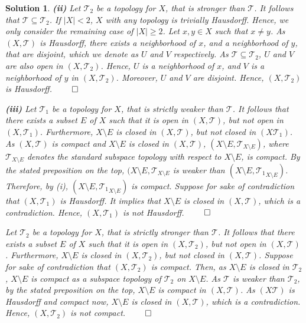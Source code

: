 \documentclass{article} %
\theoremstyle{quest}
\newtheorem*{solution}{Solution}
\begin{document}
\begin{solution}
\textbf{(ii)}
Let $\mathscr{T}_2$ be a topology for $X$, that is stronger than 
$\mathscr{T}$. It follows that $\mathscr{T} \subseteq \mathscr{T}_2$. 
If $|X| < 2$, $X$ with any topology is trivially Hausdorff. Hence,
we only consider the remaining case of $|X| \geq 2$. 
Let $x,y \in X$ such that $x \neq y$. As $(X,\mathscr{T})$ is Hausdorff,
there exists a neighborhood of $x$, and a neighborhood of $y$, that are
disjoint, which we denote as $U$ and $V$ respectively. As 
$\mathscr{T} \subseteq \mathscr{T}_2$, $U$ and $V$ are also open in 
$(X,\mathscr{T}_2)$. Hence, $U$ is a neighborhood of $x$, and $V$
is a neighborhood of $y$ in $(X,\mathscr{T}_2)$. Moreover, $U$ and $V$ are
disjoint. Hence, $(X,\mathscr{T}_2)$ is Hausdorff. \hfill $\qed$
 
\smallskip

\textbf{(iii)} 
Let $\mathscr{T}_1$
be a topology for $X$, that is strictly weaker than $\mathscr{T}$. It follows
that there exists a subset $E$ of $X$ such that it is open in 
$(X,\mathscr{T})$, but not open in $(X,\mathscr{T}_1)$. Furthermore, 
$X \setminus E$ is closed in $(X,\mathscr{T})$, but not closed in
$(X\mathscr{T}_1)$. As $(X,\mathscr{T})$ is compact and $X \setminus E$
is closed in $(X,\mathscr{T})$, $(X\setminus E, \mathscr{T}_{X\setminus E})$,
where $\mathscr{T}_{X\setminus E}$ denotes the standard subspace topology 
with respect to $X \setminus E$, is compact. By the stated preposition
on the top, $(X \setminus E , \mathscr{T}_{X \setminus E}$  
is weaker than $(X\setminus E , {\mathscr{T}_1}_{X \setminus E})$. Therefore,
by (i), $(X \setminus E, \mathscr{T_1}_{X \setminus E})$ is compact. 
Suppose for sake of contradiction that $(X, \mathscr{T}_1)$
is Hausdorff. It implies that $X \setminus E$ is closed in
$(X,\mathscr{T})$, which is a contradiction. Hence, $(X,\mathscr{T}_1)$
is not Hausdorff. \hfill $\qed$

\smallskip
 
Let $\mathscr{T}_2$ be a topology for $X$, that is strictly stronger than
$\mathscr{T}$. It follows that there exists a subset $E$ of $X$ such that
it is open in $(X,\mathscr{T}_2)$, but not open in $(X,\mathscr{T})$. 
Furthermore, $X\setminus E$ is closed in $(X,\mathscr{T}_2)$, but not
closed in $(X,\mathscr{T})$. Suppose for sake of contradiction that 
$(X,\mathscr{T}_2)$ is compact. Then, as $X \setminus E$ is closed in
$\mathscr{T}_2$,  
$X\setminus E$ is compact as a subspace topology of $\mathscr{T}_2$ on 
$X \setminus E$. 
As $\mathscr{T}$ is weaker than $\mathscr{T}_2$, by the stated preposition 
on the top, $X \setminus E$ is compact in $(X,\mathscr{T})$. As
$(X\mathscr{T})$ is Hausdorff and compact now, 
$X\setminus E$ is closed in $(X,\mathscr{T})$,
which is a contradiction. Hence, $(X,\mathscr{T}_2)$ is not compact. 
\hfill $\qed$ 
\end{solution}
\end{document}
